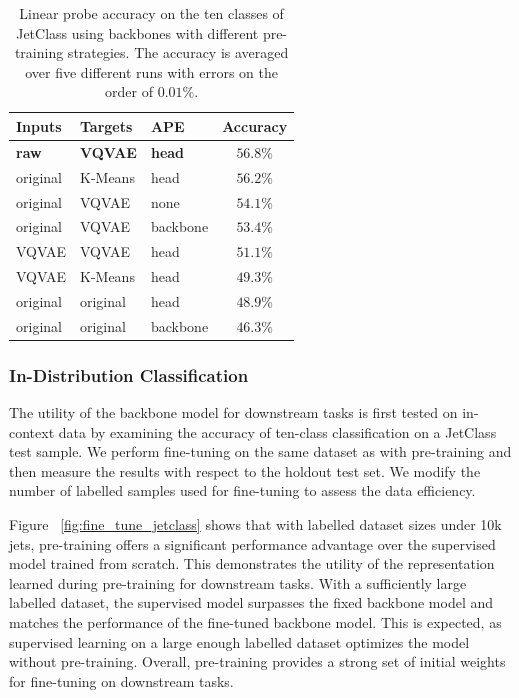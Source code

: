 \begin{table}[htp!]
    \centering
    \caption{Linear probe accuracy on the ten classes of JetClass using backbones with different pre-training strategies. The accuracy is averaged over five different runs with errors on the order of $0.01\%$.
    }
    \label{tab:pretraining_compare}
    \begin{tabular}{lllc}
        \toprule
        Inputs       & Targets        & APE           & Accuracy          \\
        \midrule
        \textbf{raw} & \textbf{VQVAE} & \textbf{head} & $\mathbf{56.8\%}$ \\
        original     & K-Means        & head          & $56.2\%$          \\
        original     & VQVAE          & none          & $54.1\%$          \\
        original     & VQVAE          & backbone      & $53.4\%$          \\
        VQVAE        & VQVAE          & head          & $51.1\%$          \\
        VQVAE        & K-Means        & head          & $49.3\%$          \\
        original     & original       & head          & $48.9\%$          \\
        original     & original       & backbone      & $46.3\%$          \\
        \bottomrule
    \end{tabular}
\end{table}

\subsubsection{In-Distribution Classification}

The utility of the backbone model for downstream tasks is first tested on in-context data by examining the accuracy of ten-class classification on a JetClass test sample.
We perform fine-tuning on the same dataset as with pre-training and then measure the results with respect to the holdout test set.
We modify the number of labelled samples used for fine-tuning to assess the data efficiency.

Figure ~\ref{fig:fine_tune_jetclass} shows that with labelled dataset sizes under 10k jets, pre-training offers a significant performance advantage over the supervised model trained from scratch.
This demonstrates the utility of the representation learned during pre-training for downstream tasks.
With a sufficiently large labelled dataset, the supervised model surpasses the fixed backbone model and matches the performance of the fine-tuned backbone model.
This is expected, as supervised learning on a large enough labelled dataset optimizes the model without pre-training.
Overall, pre-training provides a strong set of initial weights for fine-tuning on downstream tasks.

